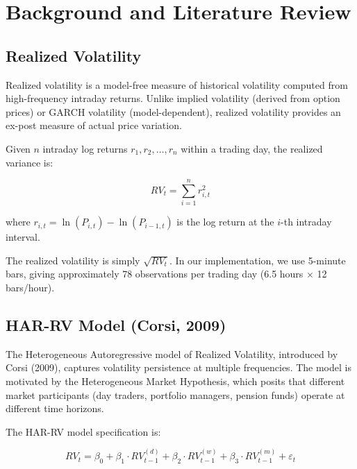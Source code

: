 \documentclass[12pt,a4paper]{article}
\begin{document}
\section{Background and Literature Review}

\subsection{Realized Volatility}

Realized volatility is a model-free measure of historical volatility computed from high-frequency intraday returns. Unlike implied volatility (derived from option prices) or GARCH volatility (model-dependent), realized volatility provides an ex-post measure of actual price variation.

Given $n$ intraday log returns $r_1, r_2, \ldots, r_n$ within a trading day, the realized variance is:

\begin{equation}
    RV_t = \sum_{i=1}^{n} r_{i,t}^2
\end{equation}

where $r_{i,t} = \ln(P_{i,t}) - \ln(P_{i-1,t})$ is the log return at the $i$-th intraday interval.

The realized volatility is simply $\sqrt{RV_t}$. In our implementation, we use 5-minute bars, giving approximately 78 observations per trading day (6.5 hours × 12 bars/hour).

\subsection{HAR-RV Model (Corsi, 2009)}

The Heterogeneous Autoregressive model of Realized Volatility, introduced by Corsi (2009), captures volatility persistence at multiple frequencies. The model is motivated by the Heterogeneous Market Hypothesis, which posits that different market participants (day traders, portfolio managers, pension funds) operate at different time horizons.

The HAR-RV model specification is:

\begin{equation}
    RV_t = \beta_0 + \beta_1 \cdot RV_{t-1}^{(d)} + \beta_2 \cdot RV_{t-1}^{(w)} + \beta_3 \cdot RV_{t-1}^{(m)} + \varepsilon_t
\end{equation}
\end{document}
